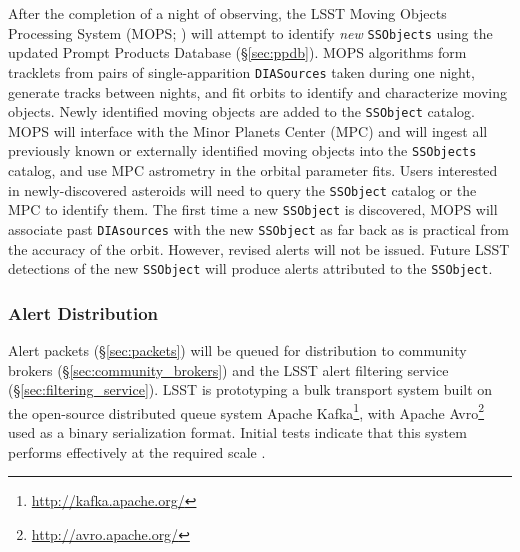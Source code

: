 After the completion of a night of observing,
the LSST Moving Objects Processing System (MOPS; ) will attempt to identify \textit{new} \texttt{SSObjects} using the updated Prompt Products Database (\S \ref{sec:ppdb}).
MOPS algorithms form tracklets from pairs of single-apparition \texttt{DIASources} taken during one night, generate tracks between nights, and fit orbits to identify and characterize moving objects.
Newly identified moving objects are added to the {\tt SSObject} catalog.
MOPS will interface with the Minor Planets Center (MPC) and will ingest all previously known or externally identified moving objects into the {\tt SSObjects} catalog, and use MPC astrometry in the orbital parameter fits.
Users interested in newly-discovered asteroids will need to query the \texttt{SSObject} catalog or the MPC to identify them.
The first time a new \texttt{SSObject} is discovered, MOPS will associate past \texttt{DIAsources} with the new \texttt{SSObject} as far back as is practical from the accuracy of the orbit.
However, revised alerts will not be issued.
Future LSST detections of the new \texttt{SSObject} will produce alerts attributed to the \texttt{SSObject}.


\subsubsection{Alert Distribution} \label{sec:alert_distribution}

Alert packets (\S \ref{sec:packets}) will be queued for distribution to community brokers (\S \ref{sec:community_brokers}) and the LSST alert filtering service (\S \ref{sec:filtering_service}).
LSST is prototyping  a bulk transport system built on the open-source distributed queue system Apache Kafka\footnote{\url{http://kafka.apache.org/}}, with Apache Avro\footnote{\url{http://avro.apache.org/}} used as a binary serialization format.
Initial tests indicate that this system performs effectively at the required scale .


